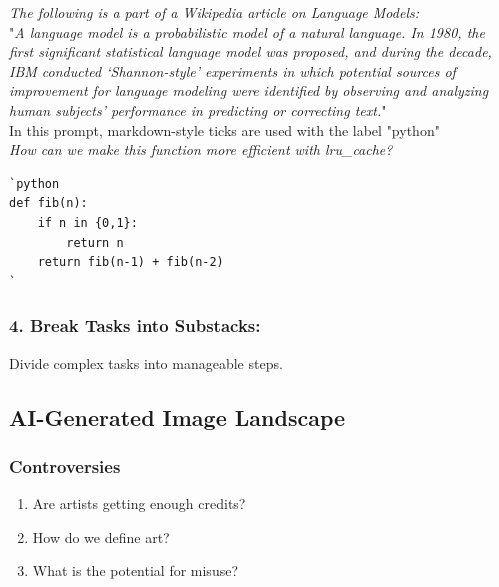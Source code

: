 \vspace{0.25cm}
\textit{The following is a part of a Wikipedia article on Language Models:}
\vspace{0.5cm}
\\
"\textit{A language model is a probabilistic model of a natural language. In 1980, the first significant statistical language model was proposed, and during the decade, IBM conducted ‘Shannon-style’ experiments in which potential sources of improvement for language modeling were identified by observing and analyzing human subjects' performance in predicting or correcting text.}" 
\vspace{0.5cm}\\
In this prompt, markdown-style ticks are used with the label "python" \\
\textit{How can we make this function more efficient with lru\_cache?}
\begin{verbatim}
`python
def fib(n):
    if n in {0,1}:
        return n
    return fib(n-1) + fib(n-2)
`
\end{verbatim}

\subsubsection*{4. Break Tasks into Substacks:}
Divide complex tasks into manageable steps.

\subsection{AI-Generated Image Landscape}
\subsubsection*{Controversies}
\begin{enumerate}[\ding{113}]
    \item Are artists getting enough credits?
    \item How do we define art?
    \item What is the potential for misuse?
\end{enumerate}

